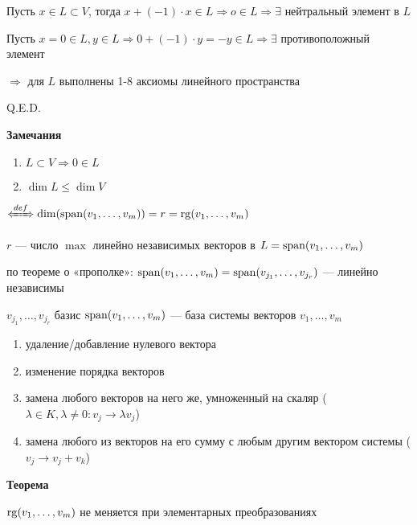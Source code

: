Пусть \(x \in L \subset V\), тогда \(x + (-1) \cdot x \in L \Rightarrow o \in L \Rightarrow \exists\) нейтральный элемент в \(L\)

Пусть \(x = 0 \in L, y \in L \Rightarrow 0 + (-1) \cdot y = -y \in L \Rightarrow \exists\) противоположный элемент

\(\Rightarrow\) для \(L\) выполнены 1-8 аксиомы линейного пространства

\hfill Q.E.D.

\textbf{Замечания}

\begin{enumerate}
    \item \(L \subset V \Rightarrow 0 \in L\)

    \item \(\dim L \le \dim V\)
\end{enumerate}

 \(\defLeftrightarrow \dim (\spann (v_1, \ldots, v_m)) = r = \rg (v_1, \ldots, v_m)\)

\(r\) --- число \(\max\) линейно независимых векторов в \(L = \operatorname{span} (v_1, \ldots, v_m)\)

по теореме о «прополке»: \(\operatorname{span} (v_1, \ldots, v_m) = \operatorname{span} (v_{j_1}, \ldots, v_{j_r})\) --- линейно независимы

\(v_{j_1}, \ldots, v_{j_r}\) базис \(\operatorname{span} (v_1, \ldots, v_m)\) --- база системы векторов \(v_1, \ldots, v_m\)


\begin{enumerate}
    \item удаление/добавление нулевого вектора

    \item изменение порядка векторов

    \item замена любого векторов на него же, умноженный на скаляр (\(\lambda \in K, \lambda \neq 0: v_j \rightarrow \lambda v_j\))

    \item замена любого из векторов на его сумму с любым другим вектором системы (\(v_j \rightarrow v_j + v_k\))
\end{enumerate}

\textbf{Теорема}

\(\operatorname{rg} (v_1, \ldots, v_m)\) не меняется при элементарных преобразованиях


